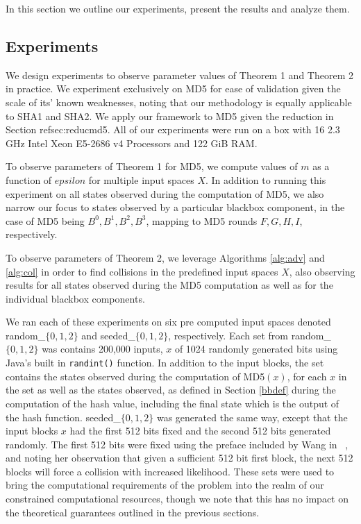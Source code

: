 \documentclass[letterpaper,twocolumn,10pt]{article}
\begin{document}
In this section we outline our experiments, present the results and analyze them. 

\subsection{Experiments} 
We design experiments to observe parameter values of Theorem 1 and Theorem 2 in practice. We experiment exclusively on MD5 for ease of validation given the scale of its' known weaknesses, noting that our methodology is equally applicable to SHA1 and SHA2. We apply our framework to MD5 given the reduction in Section {refsec:reducmd5}. All of our experiments were run on a box with 16 2.3 GHz Intel Xeon E5-2686 v4 Processors and 122 GiB RAM.

To observe parameters of Theorem 1 for MD5, we compute values of $m$ as a function of $epsilon$ for multiple input spaces $X$. In addition to running this experiment on all states observed during the computation of MD5, we also narrow our focus to states observed by a particular blackbox component, in the case of MD5 being $B^0, B^1, B^2, B^3$, mapping to MD5 rounds $F, G, H, I$, respectively. 

To observe parameters of Theorem 2, we leverage Algorithms \ref{alg:adv} and \ref{alg:col} in order to find collisions in the predefined input spaces $X$, also observing results for all states observed during the MD5 computation as well as for the individual blackbox components. 

We ran each of these experiments on six pre computed input spaces denoted random\_$\{0,1,2\}$ and seeded\_$\{0,1,2\}$, respectively. Each set from random\_$\{0,1,2\}$ was contains 200,000 inputs, $x$ of 1024 randomly generated bits using Java's built in \texttt{randint()} function. In addition to the input blocks, the set contains the states observed during the computation of MD5$(x)$, for each $x$ in the set as well as the states observed, as defined in Section \ref{bbdef} during the computation of the hash value, including the final state which is the output of the hash function. seeded\_$\{0,1,2\}$ was generated the same way, except that the input blocks $x$ had the first 512 bits fixed and the second 512 bits generated randomly. The first 512 bits were fixed using the preface included by Wang in ~\cite{wang2005break}, and noting her observation that given a sufficient 512 bit first block, the next 512 blocks will force a collision with increased likelihood. These sets were used to bring the computational requirements of the problem into the realm of our constrained computational resources, though we note that this has no impact on the theoretical guarantees outlined in the previous sections.  
\end{document}
